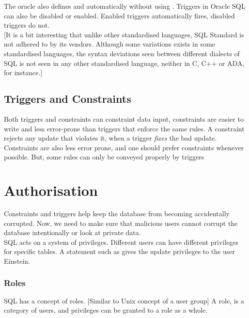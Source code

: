 \documentclass[11pt,a4paper,twocolumn]{book}
\begin{document}
The oracle also defines  and  automatically without using . Triggers in Oracle SQL can also be disabled or enabled. Enabled triggers automatically fires, disabled triggers do not.\\

[It is a bit interesting that unlike other standardised languages, SQL Standard is not adhered to by its vendors. Although some variations exists in some standardised languages, the syntax deviations seen between different dialects of SQL is not seen in any other standardised language, neither in C, C++ or ADA, for instance.]

\subsection{Triggers and Constraints}

Both triggers and constraints can constraint data input, constraints are easier to write and less error-prone than triggers that enforce the same rules. A constraint rejects any update that violates it, when a trigger \textit{fixes} the bad update. Constraints are also less error prone, and one should prefer constraints whenever possible. But, some rules can only be conveyed properly by triggers

\section{Authorisation}

Constraints and triggers help keep the database from becoming accidentally corrupted. Now, we need to make sure that malicious users cannot corrupt the database intentionally or look at private data.\\

SQL acts on a system of privileges. Different users can have different privileges for specific tables. A statement such as  gives the update privileges to the user Einstein.\\

\subsubsection{Roles}

SQL has a concept of roles. [Similar to Unix concept of a user group] A role, is a category of users, and privileges can be granted to a role as a whole.\\
\end{document}
